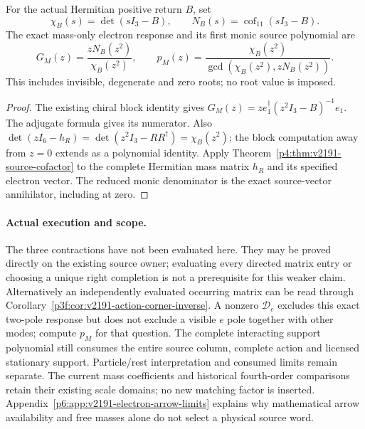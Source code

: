 \documentclass[12pt,a4paper]{article}
\begin{document}
\begin{corollary}
\label{p6:cor:v2191-mass-cofactor}
For the actual Hermitian positive return $B$, set
\[
 \chi_B(s)=\det(sI_3-B),\qquad
 N_B(s)=\operatorname{cof}_{11}(sI_3-B).
\]
The exact mass-only electron response and its first monic source polynomial
are
\[
 \boxed{G_M(z)=\frac{zN_B(z^2)}{\chi_B(z^2)},\qquad
 p_M(z)=\frac{\chi_B(z^2)}
              {\gcd(\chi_B(z^2),zN_B(z^2))}.}
\]
This includes invisible, degenerate and zero roots; no root value is imposed.
\end{corollary}
\begin{proof}
The existing chiral block identity gives
$G_M(z)=z e_1^\dagger(z^2I_3-B)^{-1}e_1$.
The adjugate formula gives its numerator. Also
$\det(zI_6-h_R)=\det(z^2I_3-RR^\dagger)=\chi_B(z^2)$;
the block computation away from $z=0$ extends as a polynomial identity.
Apply Theorem~\ref{p4:thm:v2191-source-cofactor} to the complete Hermitian
mass matrix $h_R$ and its specified electron vector. The reduced monic
denominator is the exact source-vector annihilator, including at zero.
\end{proof}

\paragraph{Actual execution and scope.}
The three contractions have not been evaluated here. They may be proved
directly on the existing source owner; evaluating every directed matrix
entry or choosing a unique right completion is not a prerequisite for this
weaker claim. Alternatively an independently evaluated occurring matrix
can be read through Corollary~\ref{p3f:cor:v2191-action-corner-inverse}.
A nonzero $\mathcal D_e$ excludes this exact two-pole response but does
not exclude a visible $e$ pole together with other modes; compute $p_M$
for that question. The complete interacting support polynomial still
consumes the entire source column, complete action and licensed stationary
support. Particle/rest interpretation and consumed limits remain separate.
The current mass coefficients and historical fourth-order comparisons
retain their existing scale domains; no new matching factor is inserted.
Appendix~\ref{p6:app:v2191-electron-arrow-limits} explains why mathematical
arrow availability and free masses alone do not select a physical source word.

\end{document}

